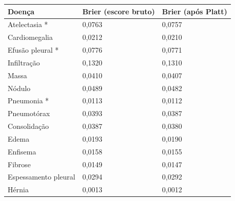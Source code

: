 \begin{tabular}{lll}
\toprule
Doença & Brier (escore bruto) & Brier (após Platt) \\
\midrule
Atelectasia * & 0,0763 & 0,0757 \\
Cardiomegalia & 0,0212 & 0,0210 \\
Efusão pleural * & 0,0776 & 0,0771 \\
Infiltração & 0,1320 & 0,1310 \\
Massa & 0,0410 & 0,0407 \\
Nódulo & 0,0489 & 0,0482 \\
Pneumonia * & 0,0113 & 0,0112 \\
Pneumotórax & 0,0393 & 0,0387 \\
Consolidação & 0,0387 & 0,0380 \\
Edema & 0,0193 & 0,0190 \\
Enfisema & 0,0158 & 0,0155 \\
Fibrose & 0,0149 & 0,0147 \\
Espessamento pleural & 0,0294 & 0,0292 \\
Hérnia & 0,0013 & 0,0012 \\
\bottomrule
\end{tabular}

